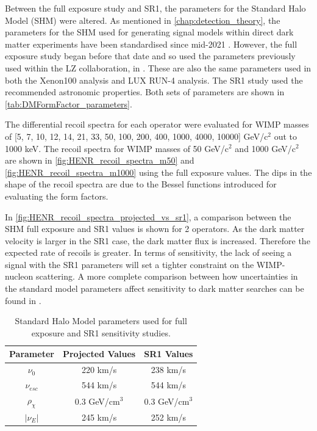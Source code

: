 \par
Between the full exposure study and SR1, the parameters for the Standard Halo Model (SHM) were altered.
As mentioned in \autoref{chap:detection_theory}, the parameters for the SHM used for generating signal models within direct dark matter experiments have been standardised since mid-2021 \cite{standard_halo_model_conventions_ref}.
However, the full exposure study began before that date and so used the parameters previously used within the LZ collaboration, in \cite{LZ_projected_sensitivity_paper_ref,LZ_TechnicalDesignReview_ref,LZ_Ibles_LZStats_Thesis_ref}.
These are also the same parameters used in both the Xenon100 analysis and LUX RUN-4 analysis.
The SR1 study used the recommended astronomic properties.
Both sets of parameters are shown in \autoref{tab:DMFormFactor_parameters}.

\par
The differential recoil spectra for each operator were evaluated for WIMP masses of [5, 7, 10, 12, 14, 21, 33, 50, 100, 200, 400, 1000, 4000, 10000] GeV/c$^{2}$ out to 1000 keV.
The recoil spectra for WIMP masses of 50 GeV/c$^2$ and 1000 GeV/c$^2$ are shown in \autoref{fig:HENR_recoil_spectra_m50} and \autoref{fig:HENR_recoil_spectra_m1000} using the full exposure values.
The dips in the shape of the recoil spectra are due to the Bessel functions introduced for evaluating the form factors.

\par
In \autoref{fig:HENR_recoil_spectra_projected_vs_sr1}, a comparison between the SHM full exposure and SR1 values is shown for 2 operators.
As the dark matter velocity is larger in the SR1 case, the dark matter flux is increased.
Therefore the expected rate of recoils is greater.
In terms of sensitivity, the lack of seeing a signal with the SR1 parameters will set a tighter constraint on the WIMP-nucleon scattering.
A more complete comparison between how uncertainties in the standard model parameters affect sensitivity to dark matter searches can be found in \cite{LZ_Ibles_LZStats_Thesis_ref,billyboxer_thesis_ref}.

\begin{table}[]
    \centering
    \begin{tabular}{c|c|c}
        Parameter         & Projected Values   & SR1 Values       \\ \hline
        $\nu_0$           & 220 km/s           & 238 km/s         \\ 
        $\nu_{esc}$       & 544 km/s           & 544 km/s         \\
        $\rho_{\chi}$     & 0.3 GeV/cm$^{3}$   & 0.3 GeV/cm$^{3}$ \\
        $|\nu_E|$         & 245 km/s           & 252 km/s  
    \end{tabular}
    \caption{Standard Halo Model parameters used for full exposure and SR1 sensitivity studies.}
    \label{tab:DMFormFactor_parameters}
\end{table}


